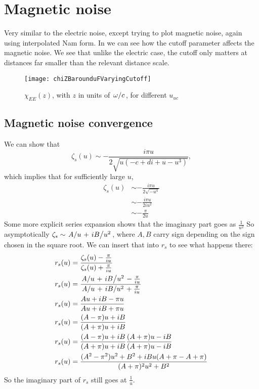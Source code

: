 \documentclass[11pt]{article}
\begin{document}
	\graphicspath{{figures/}}

	\section{Magnetic noise} \label{sec:intro}
	Very similar to the electric noise, except trying to plot magnetic noise, again using interpolated Nam form\supercite{Nam1967}.
	In  we can see how the cutoff parameter affects the magnetic noise.
	We see that unlike the electric case, the cutoff only matters at distances far smaller than the relevant distance scale.
	\begin{figure}[htp]
		\centering
		\texttt{[image: chiZBarounduFVaryingCutoff]}
		\caption{$\chi_{EE}(z)$, with $z$ in units of $\flatfrac{\omega}{c}$, for different $u_{uc}$} \label{fig:cutoff}
	\end{figure}

	\subsection{Magnetic noise convergence} \label{subsec:magneticnoiseconvergence}

	We can show that
	\begin{equation}
		\zeta_s(u) \sim - \frac{i \pi u}{2 \sqrt{u\left( - c + di + u - u^3 \right)}},
	\end{equation}
	which implies that for sufficiently large $u$,
	\begin{align}
		\zeta_s(u) &\sim - \frac{i \pi u}{2 \sqrt{- u^4}} \\
		&\sim - \frac{i \pi u}{2 i u^2} \\
		&\sim - \frac{\pi }{2 u}
	\end{align}
	Some more explicit series expansion shows that the imaginary part goes as $\frac{1}{u^2}$
	So asymptotically $\zeta_s \sim \flatfrac{A}{u} + \flatfrac{i B}{u^2}$, where $A, B$ carry sign depending on the sign chosen in the square root.
	We can insert that into $r_s$ to see what happens there:
	\begin{align}
		r_s(u) &= \frac{\zeta_s(u) - \frac{\pi}{iu }}{\zeta_s(u) + \frac{\pi}{iu}} \\
		r_s(u) &= \frac{\flatfrac{A}{u} + \flatfrac{i B}{u^2} - \frac{\pi}{iu}}{\flatfrac{A}{u} + \flatfrac{i B}{u^2} + \frac{\pi}{iu}} \\
		r_s(u) &= \frac{A u + i B - \pi u}{A u + i B + \pi u} \\
		r_s(u) &= \frac{(A - \pi) u + i B}{(A + \pi)u + i B } \\
		r_s(u) &= \frac{(A - \pi) u + i B}{(A + \pi)u + i B } \frac{{(A + \pi)u - i B }}{{(A + \pi)u - i B }} \\
		r_s(u) &= \frac{(A^2 - \pi^2) u^2 + B^2  + i B u(A + \pi - A + \pi)}{(A + \pi)^2 u^2 + B^2 }
	\end{align}
	So the imaginary part of $r_s$ still goes at $\frac{1}{u}$.
\end{document}
